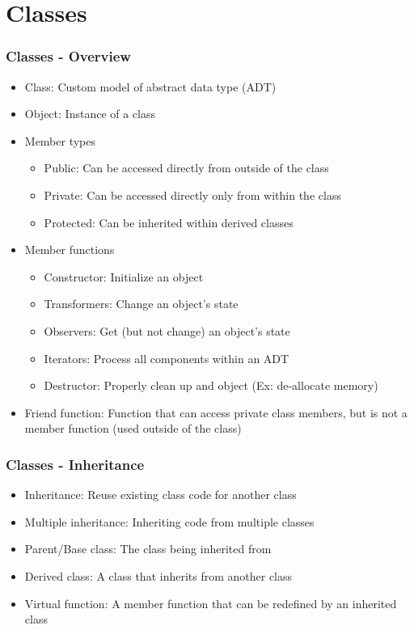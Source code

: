 \section{Classes}
\begin{frame}\frametitle{Classes - Overview}
\begin{itemize}
\item Class: Custom model of abstract data type (ADT)
\item Object: Instance of a class
\item Member types
	\begin{itemize}
	\item Public: Can be accessed directly from outside of the class
	\item Private: Can be accessed directly only from within the class
	\item Protected: Can be inherited within derived classes
	\end{itemize}
\item Member functions
	\begin{itemize}
	\item Constructor: Initialize an object
	\item Transformers: Change an object's state
	\item Observers: Get (but not change) an object's state
	\item Iterators: Process all components within an ADT
	\item Destructor: Properly clean up and object (Ex: de-allocate memory)
	\end{itemize}
\item Friend function: Function that can access private class members, but is not a member function (used outside of the class)
\end{itemize}
\end{frame}

\begin{frame}\frametitle{Classes - Inheritance}
\begin{itemize}
\item Inheritance: Reuse existing class code for another class
\item Multiple inheritance: Inheriting code from multiple classes
\item Parent/Base class: The class being inherited from
\item Derived class: A class that inherits from another class
\item Virtual function: A member function that can be redefined by an inherited class
\end{itemize}
\end{frame}

